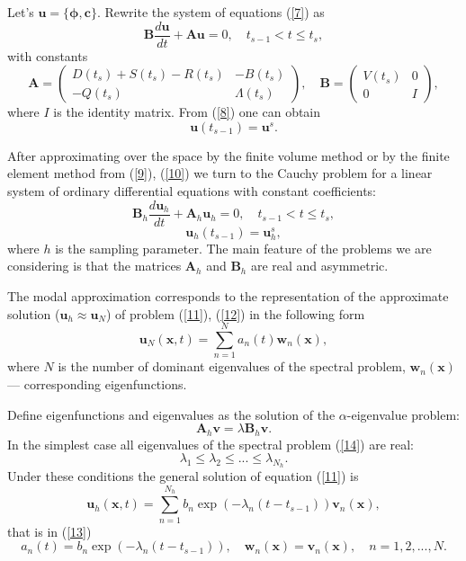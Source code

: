 \documentclass[authoryear]{elsarticle}
\begin{document}
Let's $\bm u = \{\bm \phi, \bm c\}$. Rewrite the system of equations (\ref{7}) as
\begin{equation}\label{9}
 \bm B \frac{d \bm u}{d t} + \bm A \bm u = 0,
 \quad t_{s-1} < t \leq t_s,
\end{equation} 
with constants
\[
 \bm A = 
 \begin{pmatrix}
 D(t_s)+S(t_s) - R(t_s) &  - B(t_s) \\
 - Q(t_s) & \Lambda(t_s) 
 \end{pmatrix} ,
 \quad  \bm B = 
 \begin{pmatrix}
 V(t_s) & 0 \\
 0 & I 
 \end{pmatrix} ,
\] 
where $I$ is the identity matrix. From (\ref{8}) one can obtain
\begin{equation}\label{10}
 \bm u(t_{s-1}) = \bm u^s .
\end{equation} 

After approximating over the space by the finite volume method or by the finite element method from (\ref{9}), (\ref{10}) 
we turn to the Cauchy problem for a linear system of ordinary differential equations with constant coefficients:
\begin{equation}\label{11}
 \bm B_h \frac{d \bm u_h}{d t} + \bm A_h \bm u_h = 0,
 \quad t_{s-1} < t \leq t_s,
\end{equation}   
\begin{equation}\label{12}
 \bm u_h(t_{s-1}) = \bm u_h^s ,
\end{equation} 
where $h$ is the sampling parameter. The main feature of the problems we are considering is that the matrices $\bm A_h$ and $\bm B_h$ 
are real and asymmetric.

The modal approximation corresponds to the representation of the approximate solution  ($\bm u_h \approx \bm u_N$) of problem   (\ref{11}), (\ref{12}) in the following form
\begin{equation}\label{13}
 \bm u_N(\bm x, t) =
 \sum_{n=1}^{N} a_n(t) \bm w_n(\bm x),
\end{equation} 
where $N$ is the number of dominant eigenvalues of the spectral problem, 
$\bm w_n(\bm x)$ --- corresponding eigenfunctions.

Define eigenfunctions and eigenvalues as the solution of the  $\alpha$-eigenvalue problem:
\begin{equation}\label{14}
 \bm A_h \bm v = \lambda  \bm B_h \bm v .
\end{equation} 
In the simplest case all eigenvalues of the spectral problem  (\ref{14}) are real:
\[
 \lambda_1 \leq \lambda_2 \leq ... \leq \lambda_{N_h} .
\] 
Under these conditions \citep{Laub2005,Ortega1987} the general solution of equation  (\ref{11}) is
\begin{equation}\label{15}
 \bm u_h(\bm x, t) =
 \sum_{n=1}^{N_h} b_n \exp(-\lambda_n (t-t_{s-1})) \bm v_n(\bm x) , 
\end{equation} 
that is in (\ref{13}) 
\[
 a_n(t) = b_n \exp(-\lambda_n (t-t_{s-1})) ,
 \quad \bm w_n(\bm x) = \bm v_n(\bm x),
 \quad n = 1,2, ..., N .  
\] 
\end{document}

